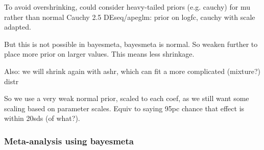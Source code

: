 \begin{outline}
\1 To avoid overshrinking, could consider heavy-tailed priors (e.g. cauchy) for mu rather than normal
    \2 Cauchy 2.5
    \2 DEseq/apeglm: prior on logfc, cauchy with scale adapted.

\1 But this is not possible in bayesmeta, bayesmeta is normal. So weaken further to place more prior on larger values. This means less shrinkage.

\1 Also: we will shrink again with ashr, which can fit a more complicated (mixture?) distr

\1 So we use a very weak normal prior, scaled to each coef, as we still want some scaling based on parameter scales.
    \2 Equiv to saying 95pc chance that effect is within 20sds (of what?).


\end{outline}

\subsubsection{Meta-analysis using bayesmeta}

